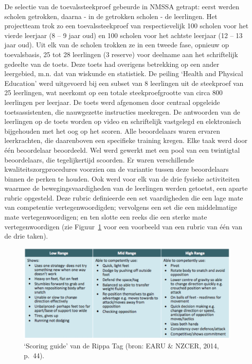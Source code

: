 \documentclass[
  letterpaper,
]{report}
\begin{document}
De selectie van de toevalssteekproef gebeurde in NMSSA getrapt: eerst
werden scholen getrokken, daarna - in de getrokken scholen - de
leerlingen. Het projectteam trok zo een toevalssteekproef van
respectievelijk 100 scholen voor het vierde leerjaar (8 -- 9 jaar oud)
en 100 scholen voor het achtste leerjaar (12 -- 13 jaar oud). Uit elk
van de scholen trokken ze in een tweede fase, opnieuw op toevalsbasis,
25 tot 28 leerlingen (3 reserve) voor deelname aan het schriftelijk
gedeelte van de toets. Deze toets had overigens betrekking op een ander
leergebied, m.n. dat van wiskunde en statistiek. De peiling `Health and
Physical Education' werd uitgevoerd bij een subset van 8 leerlingen uit
de steekproef van 25 leerlingen, wat neerkomt op een totale
steekproefgrootte van circa 800 leerlingen per leerjaar. De toets werd
afgenomen door centraal opgeleide toetsassistenten, die nauwgezette
instructies meekregen. De antwoorden van de leerlingen op de toets
worden op video en schriftelijk vastgelegd en elektronisch bijgehouden
met het oog op het scoren. Alle beoordelaars waren ervaren leerkrachten,
die daarenboven een specifieke training kregen. Elke taak werd door één
beoordelaar beoordeeld. Wel werd gewerkt met een pool van een twintigtal
beoordelaars, die tegelijkertijd scoorden. Er waren verschillende
kwaliteitszorgprocedures voorzien om de variantie tussen deze
beoordelaars binnen de perken te houden. Ook werd voor elk van de drie
fysieke activiteiten waarmee de bewegingsvaardigheden van de leerlingen
werden getoetst, een aparte rubric opgesteld. Deze rubric definieerde
een set vaardigheden die een lage mate van competentie
vertegenwoordigden; vervolgens een set die een middelmatige mate
vertegenwoordigen; en ten slotte een reeks die een sterke mate
vertegenwoordigen (zie Figuur~\ref{fig-figuur6} voor een voorbeeld van
een rubric van één van de drie taken).

\begin{figure}

{\centering \includegraphics{./FIG6.jpg}

}

\caption{\label{fig-figuur6}`Scoring guide' van de Rippa Tag (bron: EARU
\& NZCER, 2014, p.~44).}

\end{figure}
\end{document}
